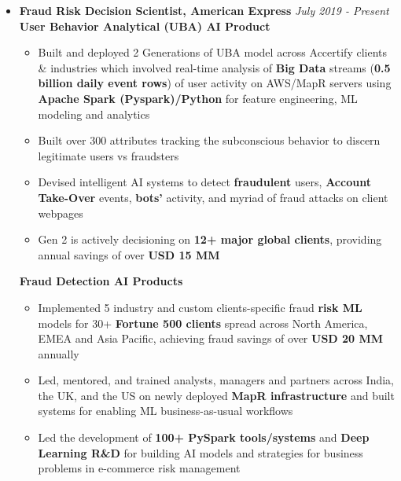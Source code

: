 \documentclass{article}
\begin{document}
\begin{itemize}

\item 
       \textbf{Fraud Risk Decision Scientist, American Express }    \hfill\textit{July 2019 - Present}
       \\[2pt]
     \textbf{User Behavior Analytical (UBA) AI Product}
    \begin{itemize}
        \item Built and deployed 2 Generations of UBA model across Accertify clients \& industries which involved real-time analysis of \textbf{Big Data} streams (\textbf{0.5 billion daily event rows}) of user activity on AWS/MapR servers using \textbf{Apache Spark (Pyspark)/Python} for feature engineering, ML modeling and analytics
        \item Built over 300 attributes tracking the subconscious behavior to discern legitimate users vs fraudsters
        \item Devised intelligent AI systems to detect \textbf{fraudulent} users, \textbf{Account Take-Over} events, \textbf{bots'} activity, and myriad of fraud attacks on client webpages
        \item Gen 2 is actively decisioning on \textbf{12+ major global clients}, providing annual savings of over \textbf{USD 15 MM}
\end{itemize}

\vspace{1.5mm}
     \textbf{Fraud Detection AI Products}
    \begin{itemize}
     \vspace{0.7mm}
        \item Implemented 5 industry and custom clients-specific fraud \textbf{risk ML} models for 30+ \textbf{Fortune 500 clients} spread across North America, EMEA and Asia Pacific, achieving fraud savings of over \textbf{USD 20 MM} annually

        \item Led, mentored, and trained analysts, managers and partners across India, the UK, and the US on newly deployed \textbf{MapR infrastructure} and built systems for enabling ML business-as-usual workflows

        \item Led the development of \textbf{100+ PySpark tools/systems} and \textbf{Deep Learning R\&D} for building AI models and strategies for business problems in e-commerce risk management


\end{itemize}

\end{itemize}
\end{document}
